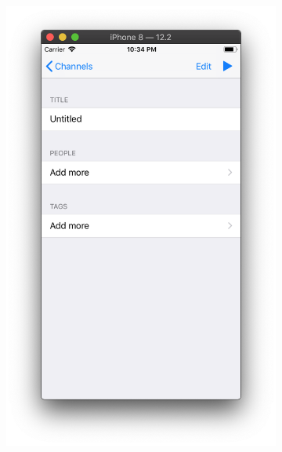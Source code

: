 \documentclass[a4paper,12pt]{article}
\begin{document}
\begin{figure}[h!]
		\begin{subfigure}[b]{0.3\linewidth}
			\includegraphics[width=\linewidth]{../includes/pmi/channel_create.png}
		\end{subfigure}
		\begin{subfigure}[b]{0.3\linewidth}

\end{subfigure}
\end{figure}
\end{document}
